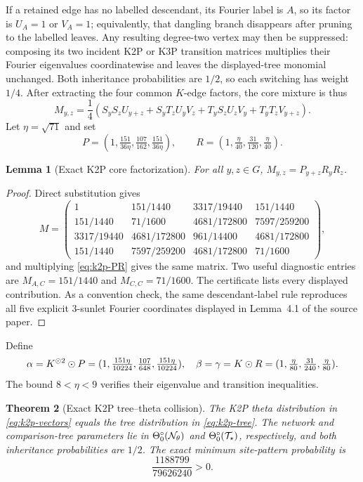\documentclass[11pt]{article}
\newtheorem{theorem}{Theorem}\newtheorem{proposition}[theorem]{Proposition}\newtheorem{lemma}[theorem]{Lemma}\newtheorem{corollary}[theorem]{Corollary}
\theoremstyle{remark}\newtheorem{remark}[theorem]{Remark}
\newcommand{\Tstar}{\mathcal T_\star}\newcommand{\Ntheta}{\mathcal N_\theta}
\begin{document}
If a retained edge has no labelled descendant, its Fourier label is $A$, so its factor is $U_A=1$ or $V_A=1$; equivalently, that dangling branch disappears after pruning to the labelled leaves. Any resulting degree-two vertex may then be suppressed: composing its two incident K2P or K3P transition matrices multiplies their Fourier eigenvalues coordinatewise and leaves the displayed-tree monomial unchanged. Both inheritance probabilities are $1/2$, so each switching has weight $1/4$. After extracting the four common $K$-edge factors, the core mixture is thus
\begin{equation}\label{eq:k2p-M}M_{y,z}=\frac14\left(S_yS_zU_{y+z}+S_yT_zU_yV_z+T_yS_zU_zV_y+T_yT_zV_{y+z}\right).\end{equation}
Let $\eta=\sqrt{71}$ and set
\begin{equation}\label{eq:k2p-PR}P=(1,\tfrac{151}{36\eta},\tfrac{107}{162},\tfrac{151}{36\eta}),\qquad R=(1,\tfrac{\eta}{40},\tfrac{31}{120},\tfrac{\eta}{40}).\end{equation}
\begin{lemma}[Exact K2P core factorization]\label{lem:k2p-factor}
For all $y,z\in G$, $M_{y,z}=P_{y+z}R_yR_z$.
\end{lemma}
\begin{proof}
Direct substitution gives
\[
M=\begin{pmatrix}
1&151/1440&3317/19440&151/1440\\
151/1440&71/1600&4681/172800&7597/259200\\
3317/19440&4681/172800&961/14400&4681/172800\\
151/1440&7597/259200&4681/172800&71/1600
\end{pmatrix},
\]
and multiplying \eqref{eq:k2p-PR} gives the same matrix. Two useful diagnostic entries are $M_{A,C}=151/1440$ and $M_{C,C}=71/1600$. The certificate lists every displayed contribution. As a convention check, the same descendant-label rule reproduces all five explicit 3-sunlet Fourier coordinates displayed in Lemma~4.1 of the source paper.
\end{proof}
Define
\begin{equation}\label{eq:k2p-tree}
\alpha=K^{\mathbin{\odot}2}\mathbin{\odot} P=(1,\tfrac{151\eta}{10224},\tfrac{107}{648},\tfrac{151\eta}{10224}),\quad
\beta=\gamma=K\mathbin{\odot} R=(1,\tfrac{\eta}{80},\tfrac{31}{240},\tfrac{\eta}{80}).
\end{equation}
The bound $8<\eta<9$ verifies their eigenvalue and transition inequalities.
\begin{theorem}[Exact K2P tree--theta collision]\label{thm:k2p}
The K2P theta distribution in \eqref{eq:k2p-vectors} equals the tree distribution in \eqref{eq:k2p-tree}. The network and comparison-tree parameters lie in $\ThetaInterior(\Ntheta)$ and $\ThetaInterior(\Tstar)$, respectively, and both inheritance probabilities are $1/2$. The exact minimum site-pattern probability is
\[
\frac{1188799}{79626240}>0.
\]
\end{theorem}
\end{document}
